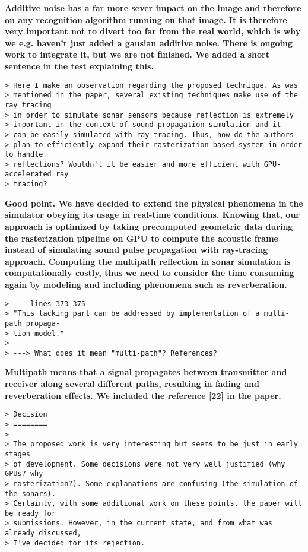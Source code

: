 \documentclass{article}
\begin{document}
\textbf{Additive noise has a far more sever impact on the image and therefore on any recognition 
algorithm running on that image. It is therefore very important not to divert too far from the real world, 
which is why we e.g. haven't just added a gausian additive noise. There is ongoing work to integrate it, 
but we are not finished. We added a short sentence in the test explaining this.}

\begin{verbatim}
> Here I make an observation regarding the proposed technique. As was
> mentioned in the paper, several existing techniques make use of the ray tracing
> in order to simulate sonar sensors because reflection is extremely
> important in the context of sound propagation simulation and it
> can be easily simulated with ray tracing. Thus, how do the authors
> plan to efficiently expand their rasterization-based system in order to handle
> reflections? Wouldn't it be easier and more efficient with GPU-accelerated ray
> tracing?
\end{verbatim}

\textbf{Good point. We have decided to extend the physical phenomena in the
simulator obeying its usage in real-time conditions. Knowing that, our approach
is optimized by taking precomputed geometric data during the rasterization
pipeline on GPU to compute the acoustic frame instead of simulating sound pulse propagation
with ray-tracing approach. Computing the multipath reflection in sonar simulation
is computationally costly, thus we need to consider the time consuming again by modeling
and including phenomena such as reverberation.}

\begin{verbatim}
> --- lines 373-375
> "This lacking part can be addressed by implementation of a multi-path propaga-
> tion model."
>
> ---> What does it mean "multi-path"? References?
\end{verbatim}

\textbf{Multipath means that a signal propagates between transmitter and receiver along
several different paths, resulting in fading and reverberation effects. We included
the reference [22] in the paper.}

\begin{verbatim}
> Decision
> ========
>
> The proposed work is very interesting but seems to be just in early stages
> of development. Some decisions were not very well justified (why GPUs? why
> rasterization?). Some explanations are confusing (the simulation of the sonars).
> Certainly, with some additional work on these points, the paper will be ready for
> submissions. However, in the current state, and from what was already discussed,
> I've decided for its rejection.
\end{verbatim}
\end{document}
